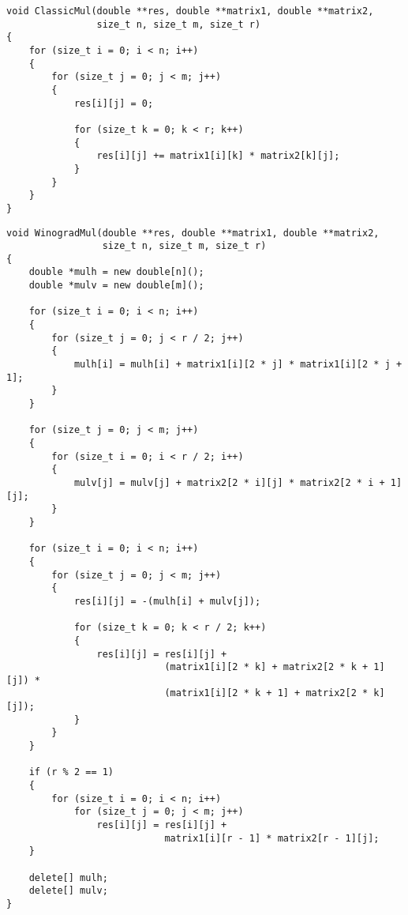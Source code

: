 \noindent\begin{minipage}{\textwidth}
\begin{lstlisting}[caption=Классический алгоритм]
void ClassicMul(double **res, double **matrix1, double **matrix2,
                size_t n, size_t m, size_t r)
{
    for (size_t i = 0; i < n; i++)
    {
        for (size_t j = 0; j < m; j++)
        {
            res[i][j] = 0;

            for (size_t k = 0; k < r; k++)
            {
                res[i][j] += matrix1[i][k] * matrix2[k][j];
            }
        }
    }
}
\end{lstlisting}
\end{minipage}

\begin{lstlisting}[caption=Алгоритм Винограда]
void WinogradMul(double **res, double **matrix1, double **matrix2,
                 size_t n, size_t m, size_t r)
{
    double *mulh = new double[n]();
    double *mulv = new double[m]();

    for (size_t i = 0; i < n; i++)
    {
        for (size_t j = 0; j < r / 2; j++)
        {
            mulh[i] = mulh[i] + matrix1[i][2 * j] * matrix1[i][2 * j + 1];
        }
    }

    for (size_t j = 0; j < m; j++)
    {
        for (size_t i = 0; i < r / 2; i++)
        {
            mulv[j] = mulv[j] + matrix2[2 * i][j] * matrix2[2 * i + 1][j];
        }
    }

    for (size_t i = 0; i < n; i++)
    {
        for (size_t j = 0; j < m; j++)
        {
            res[i][j] = -(mulh[i] + mulv[j]);

            for (size_t k = 0; k < r / 2; k++)
            {
                res[i][j] = res[i][j] +
                            (matrix1[i][2 * k] + matrix2[2 * k + 1][j]) *
                            (matrix1[i][2 * k + 1] + matrix2[2 * k][j]);
            }
        }
    }

    if (r % 2 == 1)
    {
        for (size_t i = 0; i < n; i++)
            for (size_t j = 0; j < m; j++)
                res[i][j] = res[i][j] +
                            matrix1[i][r - 1] * matrix2[r - 1][j];
    }

    delete[] mulh;
    delete[] mulv;
}
\end{lstlisting}

